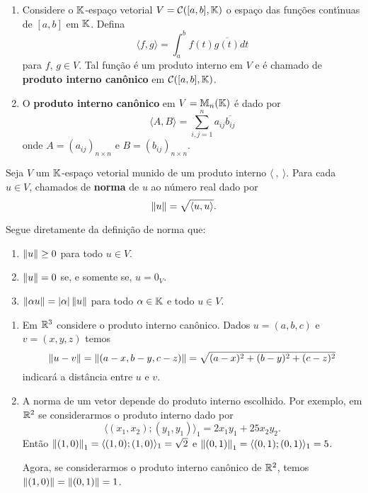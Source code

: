 \begin{exemplo}
\begin{enumerate}[label={\arabic*})]
\[		\]
		\'e um produto interno em $\cp{K}^n$. Tal produto interno \'e chamada de \textbf{produto interno can\^onico} em $\cp{K}^n$.
		\item Considere o $\mathbb{K}$-espa\c{c}o vetorial $V = \mathcal{C}([a, b], \mathbb{K})$ o espa\c{c}o das fun\c{c}\~oes cont{\'\i}nuas de $[a,b]$ em $\mathbb{K}$. Defina
   		 \[
        	\langle f , g \rangle = \int_a^bf(t)\overline{g(t)}dt
    	\]
    	para $f$, $g \in V$. Tal fun\c{c}\~ao \'e um produto interno em $V$ e \'e chamado de \textbf{produto interno can\^onico} em $\mathcal{C}([a, b], \mathbb{K})$.
    	\item O \textbf{produto interno can\^onico} em $V = \mathbb{M}_n(\mathbb{K})$ \'e dado por
    	\[
    		\langle A, B \rangle = \sum_{i, j = 1}^n a_{ij}\overline{b_{ij}}
    	\]
    	onde $A = (a_{ij})_{n \times n}$ e $B = (b_{ij})_{n \times n}$.
	\end{enumerate}
\end{exemplo}

\begin{definicao}
	Seja $V$ um $\mathbb{K}$-espa\c{c}o vetorial munido de um produto interno $\langle\ ,\ \rangle$. Para cada $u \in V$, chamados de \textbf{norma} de $u$ ao n\'umero real dado por
	\[
		\left\lVert u\right\rVert = \sqrt{\langle u, u \rangle}.
	\]
\end{definicao}

\begin{observacao}
	Segue diretamente da defini\c{c}\~ao de norma que:
	\begin{enumerate}
		\item $\left\lVert u\right\rVert \ge 0$ para todo $u \in V$.
		\item $\left\lVert u\right\rVert = 0$ se, e somente se, $u = 0_V$.
		\item $\left\lVert\alpha u\right\rVert = |\alpha|\left\lVert u\right\rVert$ para todo $\alpha \in \mathbb{K}$ e todo $u \in V$.
	\end{enumerate}
\end{observacao}

\begin{exemplo}
	\begin{enumerate}[label={\arabic*})]
		\item Em $\mathbb{R}^3$ considere o produto interno can\^onico. Dados $u = (a, b, c)$ e $v = (x, y, z)$ temos
		\[
			\left\lVert u - v\right\rVert = \left\lVert(a - x, b - y, c - z)\right\rVert = \sqrt{(a - x)^2 + (b - y)^2 + (c - z)^2}
		\]
		indicar\'a a dist\^ancia entre $u$ e $v$.
		\item A norma de um vetor depende do produto interno escolhido. Por exemplo, em $\mathbb{R}^2$ se considerarmos o produto interno dado por
		\[
			\langle (x_1, x_2); (y_1, y_1)\rangle_1 = 2x_1y_1 + 25x_2y_2.
		\]
		Ent\~ao $\left\lVert(1, 0)\right\rVert_1 = \langle (1, 0); (1, 0)\rangle_1 = \sqrt{2}$ e $\left\lVert(0, 1)\right\rVert_1 = \langle (0, 1); (0, 1)\rangle_1 = 5$.

		Agora, se considerarmos o produto interno can\^onico de $\mathbb{R}^2$, temos $\left\lVert(1, 0)\right\rVert = \left\lVert(0, 1)\right\rVert = 1$.
	\end{enumerate}
\end{exemplo}


